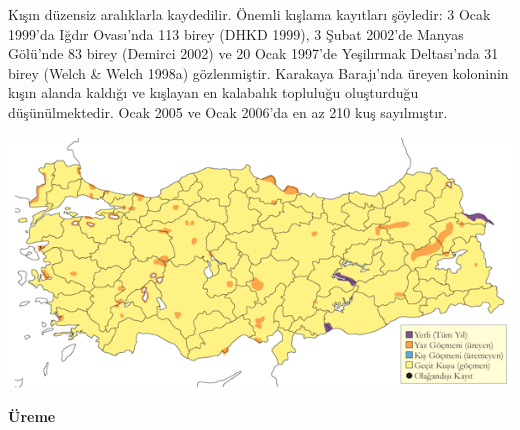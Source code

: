\documentclass[
  letterpaper,
  DIV=11,
  numbers=noendperiod]{scrreprt}
\begin{document}
Kışın düzensiz aralıklarla kaydedilir. Önemli kışlama kayıtları
şöyledir: 3 Ocak 1999'da Iğdır Ovası'nda 113 birey (DHKD 1999), 3 Şubat
2002'de Manyas Gölü'nde 83 birey (Demirci 2002) ve 20 Ocak 1997'de
Yeşilırmak Deltası'nda 31 birey (Welch \& Welch 1998a) gözlenmiştir.
Karakaya Barajı'nda üreyen koloninin kışın alanda kaldığı ve kışlayan en
kalabalık topluluğu oluşturduğu düşünülmektedir. Ocak 2005 ve Ocak
2006'da en az 210 kuş sayılmıştır.

\includegraphics{images/harita_Page_066.png}

\textbf{Üreme}
\end{document}
